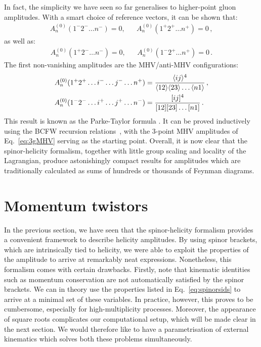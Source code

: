 \documentclass[main.tex]{subfiles}
\begin{document}
In fact, the simplicity we have seen so far generalises to higher-point gluon amplitudes. With a smart choice of reference vectors, it can be shown that:
\begin{align}
    A_n^{(0)} (1^-2^- \ldots n^-) = 0, && A_n^{(0)} (1^+2^+ \ldots n^+) = 0\,,
\end{align}
as well as:
\begin{align}
    A_n^{(0)} (1^+2^- \ldots n^-) = 0, && A_n^{(0)} (1^-2^+ \ldots n^+) = 0\,.
\end{align}
The first non-vanishing amplitudes are the MHV/anti-MHV configurations:
\begin{align} \label{eq:ParkeTaylor}
    A_n^{(0)} (1^+2^+\ldots i^- \ldots j^- \ldots n^+) &= \frac{\langle ij \rangle^4}{\langle 12 \rangle \langle 23 \rangle \ldots \langle n1 \rangle} \,, \\
    A_n^{(0)} (1^-2^-\ldots i^+ \ldots j^+ \ldots n^-) &= \frac{[ ij ]^4}{[ 12 ] [ 23 ] \ldots [ n1 ]} \,.
\end{align}
This result is known as the Parke-Taylor formula \cite{Mangano:1990by}. It can be proved inductively using the BCFW recursion relations~\cite{Britto:2004ap, Britto:2005fq}, with the 3-point MHV amplitudes of Eq.~\ref{eq:3gMHV} serving as the starting point. Overall, it is now clear that the spinor-helicity formalism, together with little group scaling and locality of the Lagrangian, produce astonishingly compact results for amplitudes which are traditionally calculated as sums of hundreds or thousands of Feynman diagrams.
\section{Momentum twistors} \label{sec:MTs}
In the previous section, we have seen that the spinor-helicity formalism provides a convenient framework to describe helicity amplitudes. By using spinor brackets, which are intrinsically tied to helicity, we were able to exploit the properties of the amplitude to arrive at remarkably neat expressions. Nonetheless, this formalism comes with certain drawbacks. Firstly, note that kinematic identities such as momentum conservation are not automatically satisfied by the spinor brackets. We can in theory use the properties listed in Eq.~\ref{eq:spinorsids} to arrive at a minimal set of these variables. In practice, however, this proves to be cumbersome, especially for high-multiplicity processes. Moreover, the appearance of square roots 
complicates our computational setup, which will be made clear in the next section. We would therefore like to have a parametrisation of external kinematics which solves both these problems simultaneously.
\end{document}
